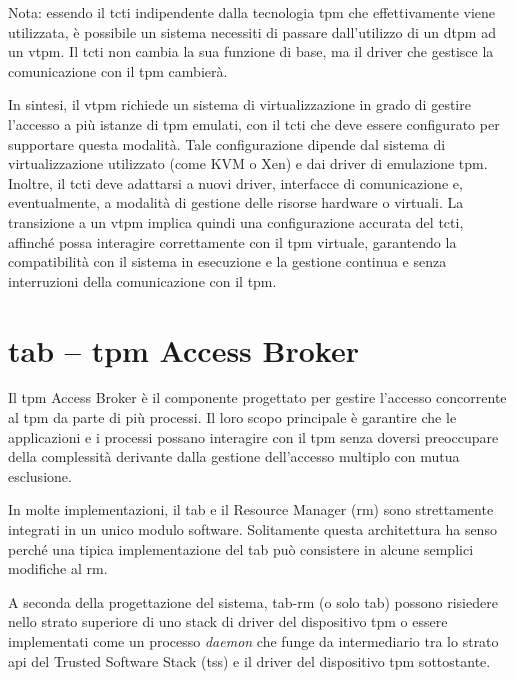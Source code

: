 Nota: essendo il \acrshort{tcti} indipendente dalla tecnologia \acrshort{tpm} che effettivamente viene utilizzata, è possibile un sistema necessiti di passare dall'utilizzo di un d\acrshort{tpm} ad un v\acrshort{tpm}. Il \acrshort{tcti} non cambia la sua funzione di base, ma il driver che gestisce la comunicazione con il \acrshort{tpm} cambierà.

In sintesi, il v\acrshort{tpm} richiede un sistema di virtualizzazione in grado di gestire l'accesso a più istanze di \acrshort{tpm} emulati, con il \acrshort{tcti} che deve essere configurato per supportare questa modalità. Tale configurazione dipende dal sistema di virtualizzazione utilizzato (come KVM o Xen) e dai driver di emulazione \acrshort{tpm}. Inoltre, il \acrshort{tcti} deve adattarsi a nuovi driver, interfacce di comunicazione e, eventualmente, a modalità di gestione delle risorse hardware o virtuali. La transizione a un v\acrshort{tpm} implica quindi una configurazione accurata del \acrshort{tcti}, affinché possa interagire correttamente con il \acrshort{tpm} virtuale, garantendo la compatibilità con il sistema in esecuzione e la gestione continua e senza interruzioni della comunicazione con il \acrshort{tpm}.

\section{\acrshort{tab} -- \acrshort{tpm} Access Broker}\label{sec:tab}

Il \acrshort{tpm} Access Broker è il componente progettato per gestire l'accesso concorrente al \acrshort{tpm} da parte di più processi. Il loro scopo principale è garantire che le applicazioni e i processi possano interagire con il \acrshort{tpm} senza doversi preoccupare della complessità derivante dalla gestione dell'accesso multiplo con mutua esclusione.

In molte implementazioni, il \acrshort{tab} e il Resource Manager (\acrshort{rm}) sono strettamente integrati in un unico modulo software. Solitamente questa architettura ha senso perché una tipica implementazione del \acrshort{tab} può consistere in alcune semplici modifiche al \acrshort{rm}.

A seconda della progettazione del sistema, \acrshort{tab}-\acrshort{rm} (o solo \acrshort{tab}) possono risiedere nello strato superiore di uno stack di driver del dispositivo \acrshort{tpm} o essere implementati come un processo \textit{daemon} che funge da intermediario tra lo strato \acrshort{api} del Trusted Software Stack (\acrshort{tss}) e il driver del dispositivo \acrshort{tpm} sottostante.


